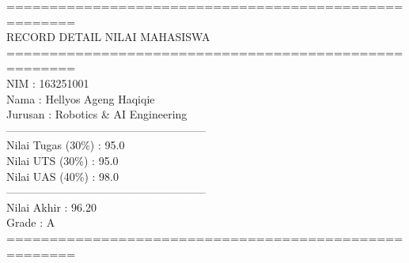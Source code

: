 \documentclass[12pt,a4paper]{article}
\begin{document}
\begin{tcolorbox}[colback=black!90!white,coltext=green!90!white,fontupper=\ttfamily\footnotesize,title=\textbf{Terminal Output Python: Input, Tampil Nilai, \& Merubah Nilai}]
======================================================\\
              RECORD DETAIL NILAI MAHASISWA           \\
======================================================\\
NIM               : 163251001\\
Nama              : Hellyos Ageng Haqiqie\\
Jurusan           : Robotics \& AI Engineering\\
------------------------------------------------------\\
Nilai Tugas (30\%) : 95.0\\
Nilai UTS (30\%)   : 95.0\\
Nilai UAS (40\%)   : 98.0\\
------------------------------------------------------\\
Nilai Akhir       : 96.20\\
Grade             : A\\
======================================================
\end{tcolorbox}

\end{document}
